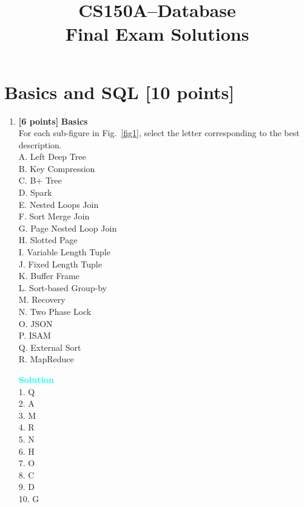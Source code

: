 \documentclass[10pt]{article}
\newenvironment{solution}
    { \begin{mdframed}[backgroundcolor=gray!10] \textcolor{cyan}{\textbf{Solution}} \\}
    {  \end{mdframed}}
\begin{document}
\title{CS150A--Database\\%
	Final Exam Solutions}
\maketitle


\section{Basics and SQL \textbf{[10 points]}}
\begin{enumerate}
	\item \textbf{[6 points]} \textbf{Basics} \\
	      For each sub-figure in Fig.~\ref{fig1}, select the letter corresponding to the best description. \\
	      A. Left Deep Tree \\
	      B. Key Compression \\
	      C. B+ Tree \\
	      D. Spark \\
	      E. Nested Loops Join \\
	      F. Sort Merge Join \\
	      G. Page Nested Loop Join \\
	      H. Slotted Page \\
	      I. Variable Length Tuple \\
	      J. Fixed Length Tuple \\
	      K. Buffer Frame \\
	      L. Sort-based Group-by \\
	      M. Recovery \\
	      N. Two Phase Lock \\
	      O. JSON \\
	      P. ISAM \\
	      Q. External Sort \\
	      R. MapReduce
	      \begin{solution}
		      1. Q  \\
		      2. A  \\
		      3. M  \\
		      4. R  \\
		      5. N \\
		      6. H  \\
		      7. O  \\
		      8. C \\
		      9. D  \\
		      10. G  \\

\end{solution}
\end{enumerate}
\end{document}
